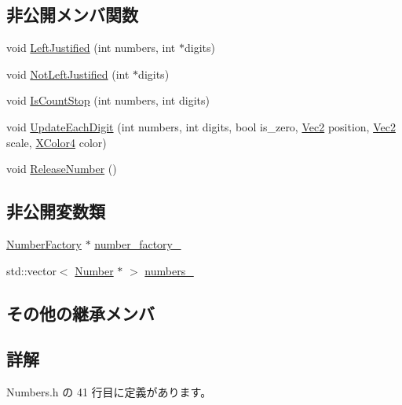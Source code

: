\subsection*{非公開メンバ関数}
\begin{DoxyCompactItemize}
\item 
void \mbox{\hyperlink{class_numbers_af4a06e0dd7dece56d60098837aae5aa5}{Left\+Justified}} (int numbers, int $\ast$digits)
\item 
void \mbox{\hyperlink{class_numbers_a1aaad1f057da0064766bfd25d57caa17}{Not\+Left\+Justified}} (int $\ast$digits)
\item 
void \mbox{\hyperlink{class_numbers_ab172b8637d38b710a4ff6dd3808522e0}{Is\+Count\+Stop}} (int numbers, int digits)
\item 
void \mbox{\hyperlink{class_numbers_a629383f243c0aeb25bf9e8d067e965a2}{Update\+Each\+Digit}} (int numbers, int digits, bool is\+\_\+zero, \mbox{\hyperlink{_vector3_d_8h_a5ef6e95dfc5f9d3820b71772d99bbc25}{Vec2}} position, \mbox{\hyperlink{_vector3_d_8h_a5ef6e95dfc5f9d3820b71772d99bbc25}{Vec2}} scale, \mbox{\hyperlink{_vector3_d_8h_a680c30c4a07d86fe763c7e01169cd6cc}{X\+Color4}} color)
\item 
void \mbox{\hyperlink{class_numbers_a1eb0843ca2449c52e21c84b96bfa4dc5}{Release\+Number}} ()
\end{DoxyCompactItemize}
\subsection*{非公開変数類}
\begin{DoxyCompactItemize}
\item 
\mbox{\hyperlink{class_number_factory}{Number\+Factory}} $\ast$ \mbox{\hyperlink{class_numbers_af9e8fa1658caf4beddfb6f450d8dc053}{number\+\_\+factory\+\_\+}}
\item 
std\+::vector$<$ \mbox{\hyperlink{class_number}{Number}} $\ast$ $>$ \mbox{\hyperlink{class_numbers_ab0649eccc71117670e5dc1ecc4cbe2a2}{numbers\+\_\+}}
\end{DoxyCompactItemize}
\subsection*{その他の継承メンバ}


\subsection{詳解}


 Numbers.\+h の 41 行目に定義があります。



